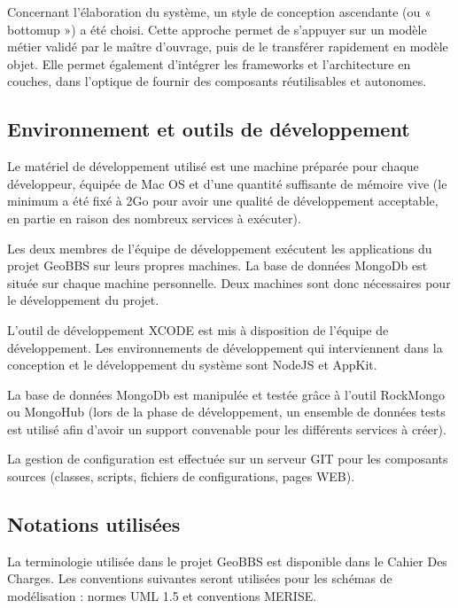 \documentclass[a4paper,12pt]{report}
\begin{document}
\begin{onehalfspace}
  Concernant l’élaboration du système, un style de conception ascendante (ou « bottomup ») a été choisi. Cette approche permet de s’appuyer sur un modèle métier validé par le maître d’ouvrage, puis de le transférer rapidement en modèle objet. Elle permet également d’intégrer les frameworks et l’architecture en couches, dans l’optique de fournir des composants réutilisables et autonomes.


\subsection{Environnement et outils de développement}
  Le matériel de développement utilisé est une machine préparée pour chaque développeur, équipée de  Mac OS et d’une quantité suffisante de mémoire vive (le minimum a été fixé à 2Go pour avoir une qualité de développement acceptable, en partie en raison des nombreux services à exécuter).

  Les deux membres de l’équipe de développement exécutent les applications du projet GeoBBS sur leurs propres machines. La base de données MongoDb est située sur chaque machine personnelle. Deux machines sont donc nécessaires pour le développement du projet.

  L’outil de développement XCODE est mis à disposition de l’équipe de développement. Les environnements de développement qui interviennent dans la conception et le développement du système sont NodeJS et AppKit.

  La base de données MongoDb est manipulée et testée grâce à l’outil RockMongo ou MongoHub (lors de la phase de développement, un ensemble de données tests est utilisé afin d’avoir un support convenable pour les différents services à créer).

  La gestion de configuration est effectuée sur un serveur GIT pour les composants sources (classes, scripts, fichiers de configurations, pages WEB).

\subsection{Notations utilisées}
  La terminologie utilisée dans le projet GeoBBS est disponible dans le Cahier Des Charges. Les conventions suivantes seront utilisées pour les schémas de modélisation : normes UML 1.5 et conventions MERISE.


\end{onehalfspace}
\end{document}
